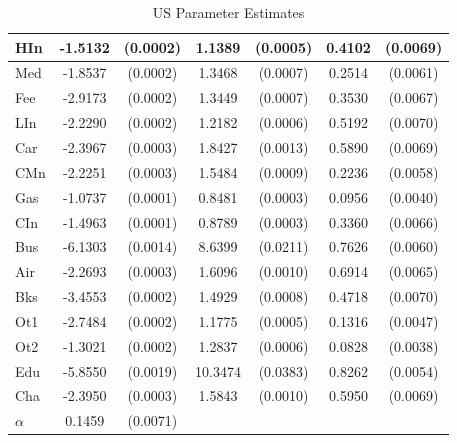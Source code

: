 \documentclass[12pt]{article}
\begin{document}
\begin{table}
\begin{center}
\begin{tabular}{|l|c c |c c |c c|}
			\hline
			HIn & -1.5132 &  (0.0002) &  1.1389 & (0.0005) &   0.4102 & (0.0069)\\ 
			\hline
			Med & -1.8537 &  (0.0002) &  1.3468 & (0.0007) &   0.2514 & (0.0061)\\ 
			\hline
			Fee & -2.9173 &  (0.0002) &  1.3449 & (0.0007) &   0.3530 & (0.0067)\\ 
			\hline
			LIn & -2.2290 &  (0.0002) &  1.2182 & (0.0006) &   0.5192 & (0.0070)\\ 
			\hline
			Car & -2.3967 &  (0.0003) &  1.8427 & (0.0013) &   0.5890 & (0.0069)\\ 
			\hline
			CMn & -2.2251 &  (0.0003) &  1.5484 & (0.0009) &   0.2236 & (0.0058)\\ 
			\hline
			Gas & -1.0737 &  (0.0001) &  0.8481 & (0.0003) &   0.0956 & (0.0040)\\ 
			\hline
			CIn & -1.4963 &  (0.0001) &  0.8789 & (0.0003) &   0.3360 & (0.0066)\\ 
			\hline
			Bus & -6.1303 &  (0.0014) &  8.6399 & (0.0211) &   0.7626 & (0.0060)\\ 
			\hline
			Air & -2.2693 &  (0.0003) &  1.6096 & (0.0010) &   0.6914 & (0.0065)\\ 
			\hline
			Bks & -3.4553 &  (0.0002) &  1.4929 & (0.0008) &   0.4718 & (0.0070)\\ 
			\hline
			Ot1 & -2.7484 &  (0.0002) &  1.1775 & (0.0005) &   0.1316 & (0.0047)\\ 
			\hline
			Ot2 & -1.3021 &  (0.0002) &  1.2837 & (0.0006) &   0.0828 & (0.0038)\\ 
			\hline
			Edu & -5.8550 &  (0.0019) & 10.3474 & (0.0383) &   0.8262 & (0.0054)\\ 
			\hline
			Cha & -2.3950 &  (0.0003) &  1.5843 & (0.0010) &   0.5950 & (0.0069)\\ 
			\hline
		        \hline	
			$\alpha$ & 0.1459 & (0.0071) & & & & \\
			\hline
			\hline
		\end{tabular}
	\end{center}
	\caption{US Parameter Estimates}
	\label{tab:parest}
\end{table}
\end{document}

